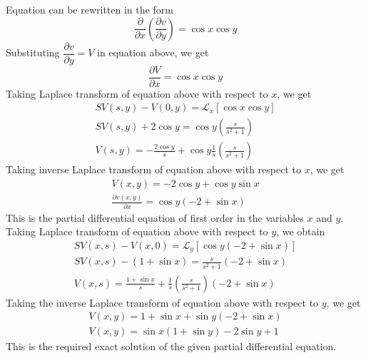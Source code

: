 \documentclass[11pt]{report}
\newcommand{\Laplace}{\mathcal{L}}
\newcommand{\NI}{\noindent}
\newcommand{\sps}{\\[0.2cm]}
\newcommand{\dsp}{\displaystyle}
\begin{document}
	\NI Equation can be rewritten in the form 
	\begin{equation*}
		\dfrac{\partial}{\partial x}\left(\frac{\partial v}{\partial y}\right) = \cos x\cos y \label{p:4_2_3}
	\end{equation*}
	Substituting $\dfrac{\partial v}{\partial y} = V$ in equation above, we get
	\begin{equation*}
		\frac{\partial V}{\partial x} = \cos x\cos y \label{p:4_2_4}
	\end{equation*}
	Taking Laplace transform of equation above with respect to $x$, we get
	\begin{equation*}
		\begin{array}{l}
			SV(s,y) - V(0,y) = \Laplace_x\left[\cos x \cos y\right]\sps
			\dsp SV(s,y) + 2\cos y = \cos y \left(\frac{s}{s^2+1}\right)\sps
			\dsp V(s,y) = -\frac{2\cos y}{s} + \cos y \frac{1}{s}\left(\frac{s}{s^2 + 1}\right)
		\end{array}\label{p:4_2_5}
	\end{equation*}
	Taking inverse Laplace transform of equation above with respect to $x$, we get
	\begin{equation*}
		\begin{array}{l}
			V(x,y) = -2\cos y + \cos y\sin x\sps
			\dsp\frac{\partial v(x,y)}{\partial x}=\cos y(-2 + \sin x)
		\end{array}\label{p:4_2_6}
	\end{equation*}
	This is the partial differential equation of first order in  the variables $x$ and $y$.\sps
	Taking Laplace transform of equation above with respect to $y$, we obtain
	\begin{equation*}
		\begin{array}{l}
			\dsp SV(x,s)-V(x,0) = \Laplace_y\left[\cos y(-2+\sin x)\right]\sps
			\dsp SV(x,s)-(1+\sin x) = \dsp\frac{s}{s^2 + 1}(-2 + \sin x)\sps
			\dsp V(x,s) = \frac{1+\sin x}{s} + \frac{1}{s}\left(\frac{s}{s^2+1}\right)(-2+\sin x)
		\end{array}\label{p:4_2_7} 
	\end{equation*}
	Taking the inverse Laplace transform of equation above with respect to $y$, we get
	\begin{equation*}
		\begin{array}{l}
			\dsp V(x,y)= 1+\sin x + \sin y(-2 + \sin x)\sps
			\dsp V(x,y) = \sin x(1+\sin y) - 2\sin y + 1
		\end{array}
	\end{equation*}
	This is the required exact solution of the given partial differential equation.
\end{document}
